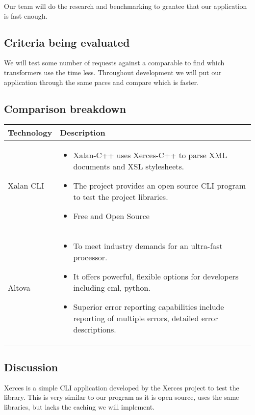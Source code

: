 Our team will do the research and benchmarking to grantee that our application is fast enough.

\subsection{Criteria being evaluated}

We will test some number of requests against a comparable to find which transformers use the time less.
Throughout development we will put our application through the same paces and compare which is faster.

\subsection{Comparison breakdown}

\begin{center}
  \begin{tabular}{ | l | p{10cm} |}
    \hline
    Technology & Description  \\ \hline
    Xalan CLI \cite{Xalan-C} &
    \begin{itemize}
      \item Xalan-C++ uses Xerces-C++ to parse XML documents and XSL stylesheets.
      \item The project provides an open source CLI program to test the project libraries.
      \item Free and Open Source
    \end{itemize}\\ \hline
    Altova \cite{Altova} &
    \begin{itemize}
      \item To meet industry demands for an ultra-fast processor.
      \item It offers powerful, flexible options for developers including cml, python.
      \item Superior error reporting capabilities include reporting of multiple errors, detailed error descriptions.
    \end{itemize} \\ \hline
  \end{tabular}
\end{center}

\subsection{Discussion}

Xerces is a simple CLI application developed by the Xerces project to test the library.
This is very similar to our program as it is open source, uses the same libraries, but lacks the caching we will implement.

